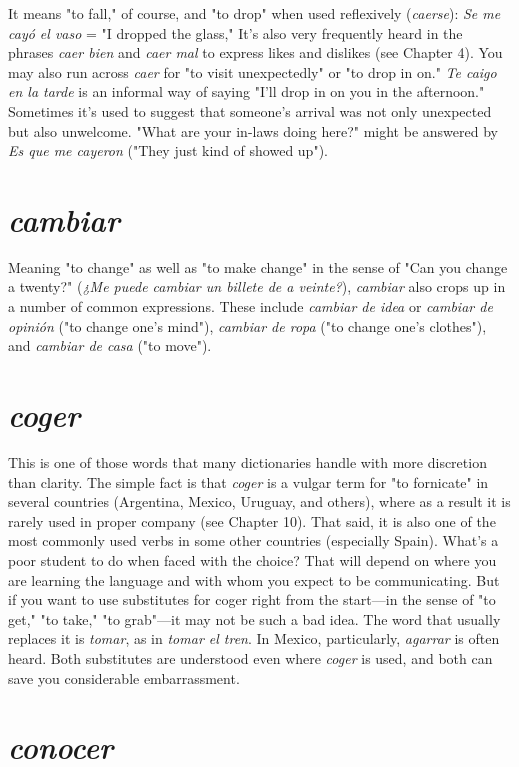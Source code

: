 It means "to fall," of course, and "to drop" when used reflexively (\emph{caerse}): \emph{Se me cayó el vaso} = "I dropped the glass," It's also
very frequently heard in the phrases \emph{caer bien} and \emph{caer mal} to express
likes and dislikes (see Chapter 4). You may also run across \emph{caer} for "to
visit unexpectedly" or "to drop in on." \emph{Te caigo en la tarde} is an informal way of saying "I'll drop in on you in the afternoon." Sometimes
it's used to suggest that someone's arrival was not only unexpected but
also unwelcome. "What are your in-laws doing here?" might be answered by \emph{Es que me cayeron} ("They just kind of showed up").

\section{\emph{cambiar}}

Meaning "to change" as well as "to make change" in the sense
of "Can you change a twenty?" (\emph{¿Me puede cambiar un billete de a
veinte?}), \emph{cambiar} also crops up in a number of common expressions.
These include \emph{cambiar de idea} or \emph{cambiar de opinión} ("to change
one's mind"), \emph{cambiar de ropa} ("to change one's clothes"), and \emph{cambiar de casa} ("to move").

\section{\emph{coger}}

This is one of those words that many dictionaries handle with
more discretion than clarity. The simple fact is that \emph{coger} is a vulgar
term for "to fornicate" in several countries (Argentina, Mexico, Uruguay, and others), where as a result it is rarely used in proper company
(see Chapter 10). That said, it is also one of the most commonly used
verbs in some other countries (especially Spain). What's a poor student
to do when faced with the choice? That will depend on where you are
learning the language and with whom you expect to be communicating. But if you want to use substitutes for coger right from the start---in the sense of "to get," "to take," "to grab"---it may not be such a bad
idea. The word that usually replaces it is \emph{tomar}, as in \emph{tomar el tren}. In
Mexico, particularly, \emph{agarrar} is often heard. Both substitutes are 
understood even where \emph{coger} is used, and both can save you considerable
embarrassment.

\section{\emph{conocer}}

